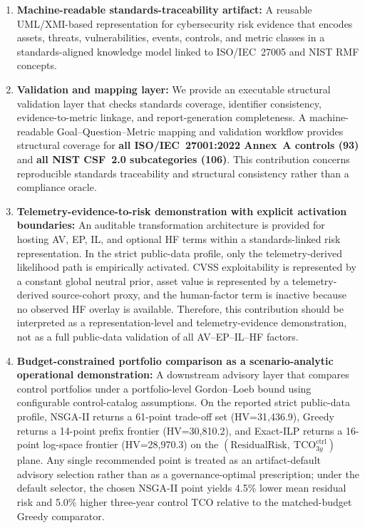 \documentclass[preprint,12pt]{elsarticle}
\begin{document}
\begin{enumerate}[label=\textbf{C\arabic*.},ref=C\arabic*,leftmargin=*]
  \item \label{contrib1} \textbf{Machine-readable standards-traceability artifact:} A reusable UML/XMI-based representation for cybersecurity risk evidence that encodes assets, threats, vulnerabilities, events, controls, and metric classes in a standards-aligned knowledge model linked to ISO/IEC~27005 and NIST RMF concepts.
  
  \item \label{contrib2} \textbf{Validation and mapping layer:} We provide an executable structural validation layer that checks standards coverage, identifier consistency, evidence-to-metric linkage, and report-generation completeness. A machine-readable Goal--Question--Metric mapping and validation workflow provides structural coverage for \textbf{all ISO/IEC~27001:2022 Annex~A controls (93)} and \textbf{all NIST CSF~2.0 subcategories (106)}. This contribution concerns reproducible standards traceability and structural consistency rather than a compliance oracle.

  \item \label{contrib3} \textbf{Telemetry-evidence-to-risk demonstration with explicit activation boundaries:} An auditable transformation architecture is provided for hosting AV, EP, IL, and optional HF terms within a standards-linked risk representation. In the strict public-data profile, only the telemetry-derived likelihood path is empirically activated. CVSS exploitability is represented by a constant global neutral prior, asset value is represented by a telemetry-derived source-cohort proxy, and the human-factor term is inactive because no observed HF overlay is available. Therefore, this contribution should be interpreted as a representation-level and telemetry-evidence demonstration, not as a full public-data validation of all AV--EP--IL--HF factors.

  \item \label{contrib4} \textbf{Budget-constrained portfolio comparison as a scenario-analytic operational demonstration:} A downstream advisory layer that compares control portfolios under a portfolio-level Gordon--Loeb bound using configurable control-catalog assumptions. On the reported strict public-data profile, NSGA-II returns a 61-point trade-off set (HV=31{,}436.9), Greedy returns a 14-point prefix frontier (HV=30{,}810.2), and Exact-ILP returns a 16-point log-space frontier (HV=28{,}970.3) on the $(\text{ResidualRisk},\ \mathrm{TCO}^{\mathrm{ctrl}}_{3y})$ plane. Any single recommended point is treated as an artifact-default advisory selection rather than as a governance-optimal prescription; under the default selector, the chosen NSGA-II point yields 4.5\% lower mean residual risk and 5.0\% higher three-year control TCO relative to the matched-budget Greedy comparator.
\end{enumerate}
\end{document}
